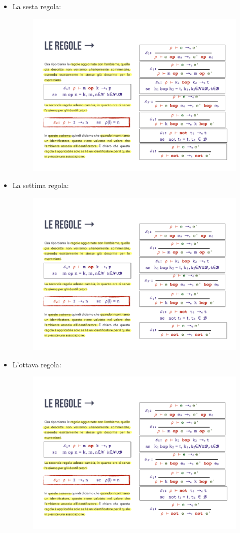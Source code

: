\documentclass[a4paper]{article}
\begin{document}
\begin{itemize}
		\item La sesta regola:
		\begin{figure}[!htp]
			\centering
			\includegraphics[width=.6\textwidth]{img/regola_espressione-6.pdf}
		\end{figure}
		
		\item La settima regola:
		\begin{figure}[!htp]
			\centering
			\includegraphics[width=.6\textwidth]{img/regola_espressione-7.pdf}
		\end{figure}
		
		\item L'ottava regola:
		\begin{figure}[!htp]
			\centering
			\includegraphics[width=.6\textwidth]{img/regola_espressione-8.pdf}
		\end{figure}
	\end{itemize}\newpage
\end{document}
